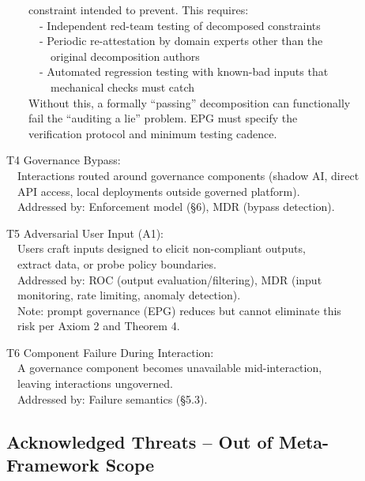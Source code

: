 \begin{claddisp}
~~~~constraint intended to prevent. This requires:\\
~~~~~~- Independent red-team testing of decomposed constraints\\
~~~~~~- Periodic re-attestation by domain experts other than the\\
~~~~~~~~original decomposition authors\\
~~~~~~- Automated regression testing with known-bad inputs that\\
~~~~~~~~mechanical checks must catch\\
~~~~Without this, a formally ``passing'' decomposition can functionally\\
~~~~fail \textemdash{} the ``auditing a lie'' problem. EPG must specify the\\
~~~~verification protocol and minimum testing cadence.
\par\smallskip
T4 \textemdash{} Governance Bypass:\\
~~Interactions routed around governance components (shadow AI, direct\\
~~API access, local deployments outside governed platform).\\
~~Addressed by: Enforcement model (\S{}6), MDR (bypass detection).
\par\smallskip
T5 \textemdash{} Adversarial User Input (A1):\\
~~Users craft inputs designed to elicit non-compliant outputs,\\
~~extract data, or probe policy boundaries.\\
~~Addressed by: ROC (output evaluation/filtering), MDR (input\\
~~monitoring, rate limiting, anomaly detection).\\
~~Note: prompt governance (EPG) reduces but cannot eliminate this\\
~~risk per Axiom 2 and Theorem 4.
\par\smallskip
T6 \textemdash{} Component Failure During Interaction:\\
~~A governance component becomes unavailable mid-interaction,\\
~~leaving interactions ungoverned.\\
~~Addressed by: Failure semantics (\S{}5.3).
\end{claddisp}


\subsection{Acknowledged Threats -- Out of Meta-Framework Scope}


